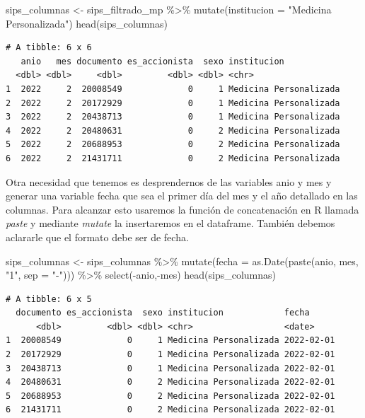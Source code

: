 \documentclass[
  letterpaper,
  DIV=11,
  numbers=noendperiod]{scrreprt}
\newenvironment{Shaded}{\begin{snugshade}}{\end{snugshade}}
\newcommand{\AttributeTok}[1]{\textcolor[rgb]{0.40,0.45,0.13}{#1}}
\newcommand{\FunctionTok}[1]{\textcolor[rgb]{0.28,0.35,0.67}{#1}}
\newcommand{\NormalTok}[1]{\textcolor[rgb]{0.00,0.23,0.31}{#1}}
\newcommand{\OtherTok}[1]{\textcolor[rgb]{0.00,0.23,0.31}{#1}}
\newcommand{\SpecialCharTok}[1]{\textcolor[rgb]{0.37,0.37,0.37}{#1}}
\newcommand{\StringTok}[1]{\textcolor[rgb]{0.13,0.47,0.30}{#1}}
\begin{document}
\begin{Shaded}
\begin{Highlighting}[]
\NormalTok{sips\_columnas }\OtherTok{\textless{}{-}}\NormalTok{ sips\_filtrado\_mp }\SpecialCharTok{\%\textgreater{}\%} \FunctionTok{mutate}\NormalTok{(}\AttributeTok{institucion =} \StringTok{"Medicina Personalizada"}\NormalTok{)}
\FunctionTok{head}\NormalTok{(sips\_columnas)}
\end{Highlighting}
\end{Shaded}

\begin{verbatim}
# A tibble: 6 x 6
   anio   mes documento es_accionista  sexo institucion           
  <dbl> <dbl>     <dbl>         <dbl> <dbl> <chr>                 
1  2022     2  20008549             0     1 Medicina Personalizada
2  2022     2  20172929             0     1 Medicina Personalizada
3  2022     2  20438713             0     1 Medicina Personalizada
4  2022     2  20480631             0     2 Medicina Personalizada
5  2022     2  20688953             0     2 Medicina Personalizada
6  2022     2  21431711             0     2 Medicina Personalizada
\end{verbatim}

Otra necesidad que tenemos es desprendernos de las variables anio y mes
y generar una variable fecha que sea el primer día del mes y el año
detallado en las columnas. Para alcanzar esto usaremos la función de
concatenación en R llamada \emph{paste} y mediante \emph{mutate} la
insertaremos en el dataframe. También debemos aclararle que el formato
debe ser de fecha.

\begin{Shaded}
\begin{Highlighting}[]
\NormalTok{sips\_columnas }\OtherTok{\textless{}{-}}\NormalTok{ sips\_columnas }\SpecialCharTok{\%\textgreater{}\%} 
  \FunctionTok{mutate}\NormalTok{(}\AttributeTok{fecha =} \FunctionTok{as.Date}\NormalTok{(}\FunctionTok{paste}\NormalTok{(anio, mes, }\StringTok{"1"}\NormalTok{, }\AttributeTok{sep =} \StringTok{"{-}"}\NormalTok{))) }\SpecialCharTok{\%\textgreater{}\%} 
  \FunctionTok{select}\NormalTok{(}\SpecialCharTok{{-}}\NormalTok{anio,}\SpecialCharTok{{-}}\NormalTok{mes)}
\FunctionTok{head}\NormalTok{(sips\_columnas)}
\end{Highlighting}
\end{Shaded}

\begin{verbatim}
# A tibble: 6 x 5
  documento es_accionista  sexo institucion            fecha     
      <dbl>         <dbl> <dbl> <chr>                  <date>    
1  20008549             0     1 Medicina Personalizada 2022-02-01
2  20172929             0     1 Medicina Personalizada 2022-02-01
3  20438713             0     1 Medicina Personalizada 2022-02-01
4  20480631             0     2 Medicina Personalizada 2022-02-01
5  20688953             0     2 Medicina Personalizada 2022-02-01
6  21431711             0     2 Medicina Personalizada 2022-02-01
\end{verbatim}
\end{document}
